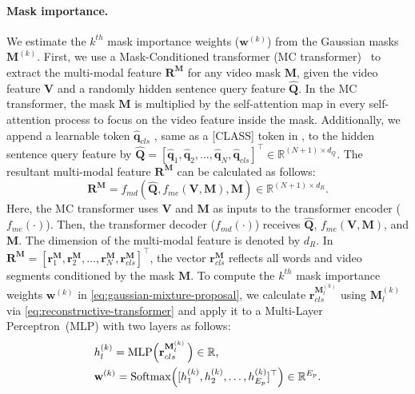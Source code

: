 \paragraph{Mask importance.}
We estimate the $k^{th}$ mask importance weights ($\mathbf{w}^{(k)}$) from the Gaussian masks $\mathbf{M}^{(k)}$. %
First, we use a Mask-Conditioned transformer (MC transformer)~\cite{zheng2022cnm,lin2020weakly} to extract the multi-modal feature $\mathbf{R}^\mathbf{M}$ for any video mask $\mathbf{M}$, given the video feature $\mathbf{V}$ and a randomly hidden sentence query feature $\widehat{\mathbf{Q}}$.
In the MC transformer, the mask $\mathbf{M}$ is multiplied by the self-attention map in every self-attention process to focus on the video feature inside the mask.
Additionally, we append a learnable token $\widehat{\mathbf{q}}_{cls}$
, same as a [CLASS] token in \cite{devlin2018bert}, 
to the hidden sentence query feature by
$\widehat{\mathbf{Q}}=[\widehat{\mathbf{q}}_1,\widehat{\mathbf{q}}_2,\dots,\widehat{\mathbf{q}}_N, \widehat{\mathbf{q}}_{cls}]^\top \in \mathbb{R}^{(N+1)\times d_Q} \text{.}$
The resultant multi-modal
feature $\mathbf{R}^\mathbf{M}$ can be calculated as follows:
\begin{equation}
  \mathbf{R}^\mathbf{M}=f_{md}(\widehat{\mathbf{Q}}, f_{me}(\mathbf{V},\mathbf{M}), \mathbf{M}) \in \mathbb{R}^{(N+1)\times d_R} \text{.}
  \label{eq:reconstructive-transformer}
\end{equation}
Here, the MC transformer uses $\mathbf{V}$ and $\mathbf{M}$ as inputs to the transformer encoder ($f_{me}(\cdot)$).
Then, the transformer decoder ($f_{md}(\cdot)$) receives  $\widehat{\mathbf{Q}}$, $f_{me}(\mathbf{V},\mathbf{M})$, and $\mathbf{M}$. 
The dimension of the multi-modal feature is denoted by $d_R$.
In $\mathbf{R}^\mathbf{M}=[\mathbf{r}^\mathbf{M}_1,\mathbf{r}^\mathbf{M}_2,\dots,\mathbf{r}^\mathbf{M}_{N}, \mathbf{r}^\mathbf{M}_{cls}]^\top$, the vector $\mathbf{r}^\mathbf{M}_{cls}$ reflects all words and video segments conditioned by the mask $\mathbf{M}$.
To compute the $k^{th}$ mask importance weights $\mathbf{w}^{(k)}$ in \cref{eq:gaussian-mixture-proposal}, we calculate $\mathbf{r}^{\mathbf{M}_{l}^{(k)}}_{cls}$ using $\mathbf{M}_{l}^{(k)}$ via \cref{eq:reconstructive-transformer} and apply it to a Multi-Layer Perceptron~(MLP) with two layers as follows:
\begin{align}
  &h^{(k)}_l = \mathrm{MLP}\Bigl(\mathbf{r}^{\mathbf{M}_{l}^{(k)}}_{cls}\,\Bigr)\in \mathbb{R} \text{,}
  \label{eq:mask-importance-value} \\
  &\mathbf{w}^{(k)} = \mathrm{Softmax}\Bigl([h^{(k)}_1,h^{(k)}_2,\dots,h^{(k)}_{E_p}]^\top\Bigr) \in\mathbb{R}^{E_p} \text{.}
  \label{eq:mask-importance-weight}
\end{align}

